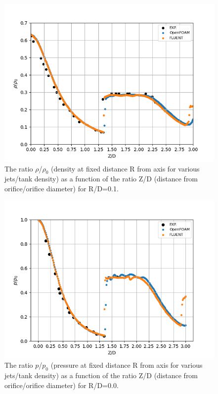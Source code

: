 \documentclass[12pt]{article}
\begin{document}
\begin{figure}[H]
    \centering
    \includegraphics[width=0.85\linewidth]{figs/rho_ratio_vs_ZoD.png}
    \caption{The ratio $\rho$/$\rho_0$ (density at fixed distance R from axis for various jets/tank density) as a function of the ratio Z/D (distance from orifice/orifice diameter) for R/D=0.1.}
    \label{fig:density_ratio}
\end{figure}

\begin{figure}[H]
    \centering
    \includegraphics[width=0.85\linewidth]{figs/pressure_ratio_vs_ZoD.png}
    \caption{The ratio $p$/$p_0$ (pressure at fixed distance R from axis for various jets/tank density) as a function of the ratio Z/D (distance from orifice/orifice diameter) for R/D=0.0.}
    \label{fig:pressure_ratio}
\end{figure}
\end{document}
